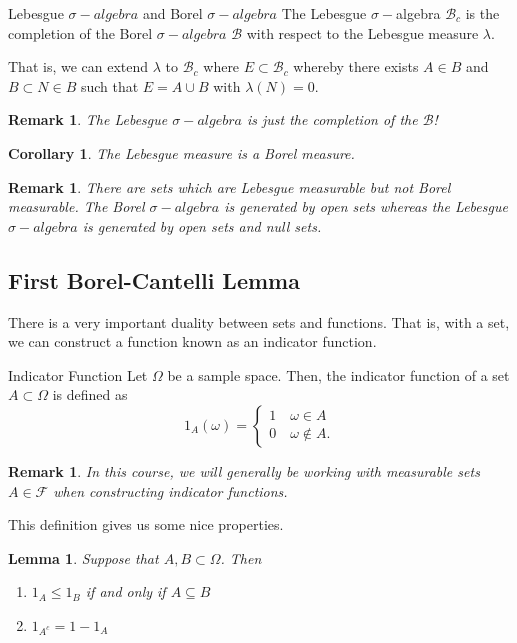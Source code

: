 \documentclass[twoside]{article}
\newtheorem{lemma}[theorem]{Lemma}
\newtheorem{corollary}[theorem]{Corollary}
\newtheorem{remark}[theorem]{Remark}
\newcommand{\sigmalgebra}{\mathcal{F}}
\newcommand{\borelsigmaalgebra}{\mathcal{B}}
\newcommand{\sa}{\sigma-algebra}
\begin{document}
\begin{proposition_exam}{Lebesgue $\sa$ and Borel $\sa$}{} The Lebesgue $\sigma-$algebra $\borelsigmaalgebra_c$ is the completion of the Borel $\sa$ $\borelsigmaalgebra$ with respect to the Lebesgue measure $\lambda.$ 

That is, we can extend $\lambda$ to $\borelsigmaalgebra_c$ where $E \subset \borelsigmaalgebra_c$ whereby there exists $A \in B$ and $B \subset N \in B$ such that $E = A \cup B$ with $\lambda (N) = 0.$ 
\end{proposition_exam}

\begin{remark}The Lebesgue $\sa$ is just the completion of the $\borelsigmaalgebra$!
\end{remark}

\begin{corollary}The Lebesgue measure is a Borel measure.
\end{corollary}

\begin{remark}There are sets which are Lebesgue measurable but not Borel measurable. The Borel $\sa$ is generated by open sets whereas the Lebesgue $\sa$ is generated by open sets and null sets.
\end{remark}

\subsection{First Borel-Cantelli Lemma}

There is a very important duality between sets and functions. That is, with a set, we can construct a function known as an indicator function.

\begin{definition_exam}{Indicator Function}{} Let $\Omega$ be a sample space. Then, the indicator function of a set $A \subset \Omega$ is defined as 
$$
1_{A}(\omega) = 
\begin{cases}
1 \quad \omega \in A\\
0 \quad \omega \not \in A.
\end{cases}
$$
\end{definition_exam}

\begin{remark} In this course, we will generally be working with measurable sets $A \in \sigmalgebra$ when constructing indicator functions.
\end{remark}

This definition gives us some nice properties.
\begin{lemma} Suppose that $A, B \subset \Omega$. Then 
\begin{enumerate}
\item $1_A \leq 1_B$ if and only if $A \subseteq B$
\item $1_{A^{c}} = 1 - 1_A$
\end{enumerate}
\end{lemma}
\end{document}
